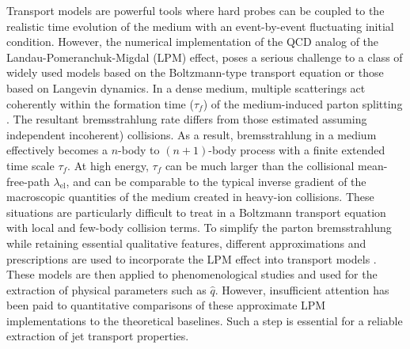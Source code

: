 \documentclass[aps, prc, reprint, amsmath, groupedaddress, nofootinbib]{revtex4-1}
\begin{document}
Transport models are powerful tools where hard probes can be coupled to the realistic time evolution of the medium with an event-by-event fluctuating initial condition. 
However, the numerical implementation of the QCD analog of the Landau-Pomeranchuk-Migdal (LPM) effect, poses a serious challenge to a class of widely used models based on the Boltzmann-type transport equation or those based on Langevin dynamics.
In a dense medium, multiple scatterings act coherently within the formation time ($\tau_f$) of the medium-induced parton splitting \cite{PhysRev.103.1811,Wang:1994fx,Zakharov:1996fv,Zakharov:1997uu,Baier:1996kr,Baier:1996sk}.
The resultant bremsstrahlung rate differs from those estimated assuming independent incoherent) collisions.
As a result, bremsstrahlung in a medium effectively becomes a  $n$-body to $(n+1)$-body process with a finite extended time scale $\tau_f$. At high energy, $\tau_f$ can be much larger than the collisional mean-free-path $\lambda_{\textrm{el}}$, and can be comparable to the typical inverse gradient of the macroscopic quantities of the medium created in heavy-ion collisions.
These situations are particularly difficult to treat in a Boltzmann transport equation with local and few-body collision terms. 
To simplify the parton bremsstrahlung while retaining essential qualitative features, different approximations and prescriptions are used to incorporate the LPM effect into transport models \cite{Cao:2013ita,ColemanSmith:2012vr,Xu:2004mz,Zapp:2011ya,Gossiaux:2012cv,Park:thesis}.
These models are then applied to phenomenological studies and used for the extraction of physical parameters such as $\hat{q}$.
However, insufficient attention has been paid to quantitative comparisons of these approximate LPM implementations to the theoretical baselines.
Such a step is essential for a reliable extraction of jet transport properties.
\end{document}
